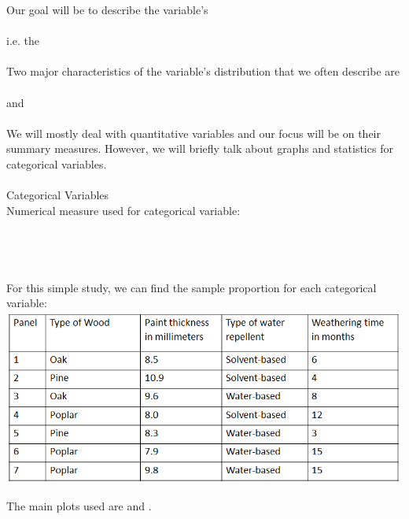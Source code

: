 Our goal will be to describe the variable's \underbar{~~~~~~~~~~~~~~~~~~~~~~~~~~~~~~~~~~~~}\\~\\
i.e. the \\~\\

Two major characteristics of the variable's distribution that we often describe are \underbar{~~~~~~~~~~~~~~~~~~~~~~~~~~~~~~~~~~~~}\\~\\ and \underbar{~~~~~~~~~~~~~~~~~~~~~~~~~~~~~~~~~~~~}\\~\\

We will mostly deal with quantitative variables and our focus will be on their summary measures.  However, we will briefly talk about graphs and statistics for categorical variables.\\~\\

\huge Categorical Variables \normalsize\\
Numerical measure used for categorical variable:\\~\\~\\~\\~\\
For this simple study, we can find the sample proportion for each categorical variable:\\
\includegraphics[scale=0.5]{paintexample}

\newpage

The main plots used are \underbar{~~~~~~~~~~~~~~~~~~~~~~~~~~~~~~~~~~~~} and  \underbar{~~~~~~~~~~~~~~~~~~~~~~~~~~~~~~~~~~~~}.\\~\\
 
